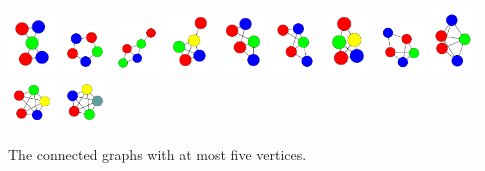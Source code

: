 \documentclass[openany]{tufte-book} %
\theoremstyle{plain}
\begin{document}
\begin{marginfigure}
		\includegraphics[width=0.5in]{graphs/all/0101011011.pdf}
		\includegraphics[width=0.5in]{graphs/all/0110011010.pdf}
		\includegraphics[width=0.5in]{graphs/all/0111001110.pdf}
		\includegraphics[width=0.5in]{graphs/all/0111001111.pdf}
		\includegraphics[width=0.5in]{graphs/all/0111011010.pdf}
		\includegraphics[width=0.5in]{graphs/all/0111011011.pdf}
		\includegraphics[width=0.5in]{graphs/all/0111011111.pdf}
		\includegraphics[width=0.5in]{graphs/all/0111111010.pdf}
		\includegraphics[width=0.5in]{graphs/all/0111111011.pdf}
		\includegraphics[width=0.5in]{graphs/all/0111111111.pdf}
		\includegraphics[width=0.5in]{graphs/all/1111111111.pdf}
		\caption{The connected graphs with at most five vertices.}
		\label{fig:SmallGraphs}
\end{marginfigure}
\end{document}
